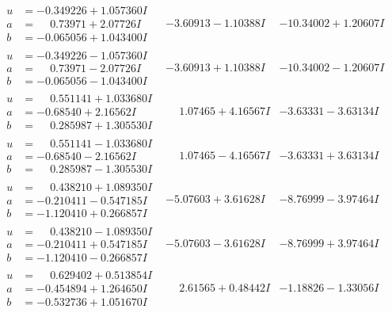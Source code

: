 \documentclass[1p]{elsarticle_modified}
\theoremstyle{definition}
\begin{document}
$$\begin{array}{c|c|c}
\begin{aligned}
u &= -0.349226 + 1.057360 I \\
a &= \phantom{-}0.73971 + 2.07726 I \\
b &= -0.065056 + 1.043400 I\end{aligned}
 & -3.60913 - 1.10388 I & -10.34002 + 1.20607 I \\ \hline\begin{aligned}
u &= -0.349226 - 1.057360 I \\
a &= \phantom{-}0.73971 - 2.07726 I \\
b &= -0.065056 - 1.043400 I\end{aligned}
 & -3.60913 + 1.10388 I & -10.34002 - 1.20607 I \\ \hline\begin{aligned}
u &= \phantom{-}0.551141 + 1.033680 I \\
a &= -0.68540 + 2.16562 I \\
b &= \phantom{-}0.285987 + 1.305530 I\end{aligned}
 & \phantom{-}1.07465 + 4.16567 I & -3.63331 - 3.63134 I \\ \hline\begin{aligned}
u &= \phantom{-}0.551141 - 1.033680 I \\
a &= -0.68540 - 2.16562 I \\
b &= \phantom{-}0.285987 - 1.305530 I\end{aligned}
 & \phantom{-}1.07465 - 4.16567 I & -3.63331 + 3.63134 I \\ \hline\begin{aligned}
u &= \phantom{-}0.438210 + 1.089350 I \\
a &= -0.210411 - 0.547185 I \\
b &= -1.120410 + 0.266857 I\end{aligned}
 & -5.07603 + 3.61628 I & -8.76999 - 3.97464 I \\ \hline\begin{aligned}
u &= \phantom{-}0.438210 - 1.089350 I \\
a &= -0.210411 + 0.547185 I \\
b &= -1.120410 - 0.266857 I\end{aligned}
 & -5.07603 - 3.61628 I & -8.76999 + 3.97464 I \\ \hline\begin{aligned}
u &= \phantom{-}0.629402 + 0.513854 I \\
a &= -0.454894 + 1.264650 I \\
b &= -0.532736 + 1.051670 I\end{aligned}
 & \phantom{-}2.61565 + 0.48442 I & -1.18826 - 1.33056 I \\ \hline\begin{aligned}

\end{aligned}
\end{array}$$
\end{document}
